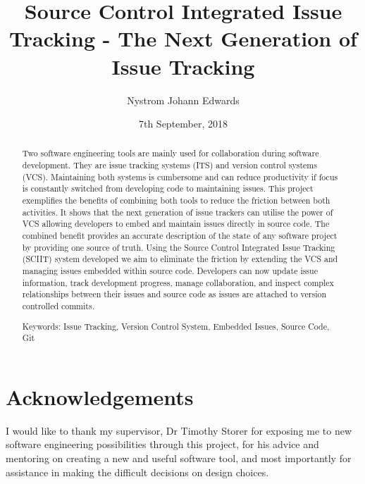 \documentclass{mproj}
\begin{document}
\title{Source Control Integrated Issue Tracking - The Next Generation of Issue Tracking}
\author{Nystrom Johann Edwards}
\date{7th September, 2018}
\maketitle

\begin{abstract}
Two software engineering tools are mainly used for collaboration during software development. They are issue tracking systems (ITS) and version control systems (VCS). Maintaining both systems is cumbersome and can reduce productivity if focus is constantly switched from developing code to maintaining issues. This project exemplifies the benefits of combining both tools to reduce the friction between both activities. It shows that the next generation of issue trackers can utilise the power of VCS allowing developers to embed  and maintain issues directly in source code. The combined benefit provides an accurate description of the state of any software project by providing one source of truth. Using the Source Control Integrated Issue Tracking (SCIIT) system developed we aim to eliminate the friction by extending the VCS and managing issues embedded within source code. Developers can now update issue information, track development progress, manage collaboration, and inspect complex relationships between their issues and source code as issues are attached to version controlled commits.  

Keywords: Issue Tracking, Version Control System, Embedded Issues, Source Code, Git
\end{abstract}

\educationalconsent
\newpage

\section*{Acknowledgements}

I would like to thank my supervisor, Dr Timothy Storer for exposing me to new software engineering possibilities through this project, for his advice and mentoring on creating a new and useful software tool, and most importantly for assistance in making the difficult decisions on design choices.
\end{document}
